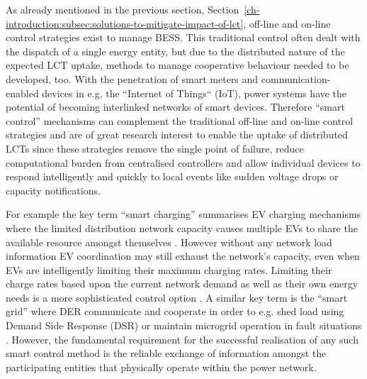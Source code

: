 
As already mentioned in the previous section, Section~\ref{ch-introduction:subsec:solutions-to-mitigate-impact-of-lct}, off-line and on-line control strategies exist to manage BESS.
This traditional control often dealt with the dispatch of a single energy entity, but due to the distributed nature of the expected LCT uptake, methods to manage cooperative behaviour needed to be developed, too.
With the penetration of smart meters and communication-enabled devices in e.g. the ``Internet of Things`` (IoT), power systems have the potential of becoming interlinked networks of smart devices.
Therefore ``smart control'' mechanisms can complement the traditional off-line and on-line control strategies and are of great research interest to enable the uptake of distributed LCTs since these strategies remove the single point of failure, reduce computational burden from centralised controllers and allow individual devices to respond intelligently and quickly to local events like sudden voltage drops or capacity notifications.

For example the key term ``smart charging'' summarises EV charging mechanisms where the limited distribution network capacity causes multiple EVs to share the available resource amongst themselves \cite{Sortomme2011, Vaya2012, Garcia-Villalobos2014}.
However without any network load information EV coordination may still exhaust the network's capacity, even when EVs are intelligently limiting their maximum charging rates.
Limiting their charge rates based upon the current network demand as well as their own energy needs is a more sophisticated control option \cite{Karfopoulos2013}.
A similar key term is the ``smart grid'' where DER communicate and cooperate in order to e.g. shed load using Demand Side Response (DSR) or maintain microgrid operation in fault situations \cite{Samadi2012, Liu2014, Liang2014}.
However, the fundamental requirement for the successful realisation of any such smart control method is the reliable exchange of information amongst the participating entities that physically operate within the power network.

